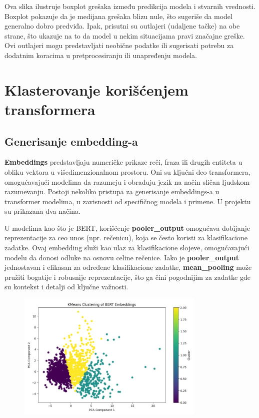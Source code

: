 \documentclass{article}
\begin{document}
Ova slika ilustruje boxplot grešaka između predikcija modela i stvarnih vrednosti. Boxplot pokazuje da je medijana grešaka blizu nule, što sugeriše da model generalno dobro predviđa. Ipak, prisutni su outlajeri (udaljene tačke) na obe strane, što ukazuje na to da model u nekim situacijama pravi značajne greške. Ovi outlajeri mogu predstavljati neobične podatke ili sugerisati potrebu za dodatnim koracima u pretprocesiranju ili unapređenju modela.



\section{Klasterovanje korišćenjem transformera}

\subsection{Generisanje embedding-a}

\textbf{Embeddings} predstavljaju numeričke prikaze reči, fraza ili drugih entiteta u obliku vektora u višedimenzionalnom prostoru. Oni su ključni deo transformera, omogućavajući modelima da razumeju i obrađuju jezik na način sličan ljudskom razumevanju. Postoji nekoliko pristupa za generisanje embeddings-a u transformer modelima, u zavisnosti od specifičnog modela i primene. U projektu su prikazana dva načina.

\vspace{1em}
U modelima kao što je BERT, korišćenje \textbf{pooler\_output} omogućava dobijanje reprezentacije za ceo unos (npr. rečenicu), koja se često koristi za klasifikacione zadatke. Ovaj embedding služi kao ulaz za klasifikacione slojeve, omogućavajući modelu da donosi odluke na osnovu celine rečenice. Iako je \textbf{pooler\_output} jednostavan i efikasan za određene klasifikacione zadatke, \textbf{mean\_pooling} može pružiti bogatije i robusnije reprezentacije, što ga čini pogodnijim za zadatke gde su kontekst i detalji od ključne važnosti.

\newpage
\begin{figure}[h]
    \centering 
    \includegraphics[width=0.8\textwidth]{ri5.jpeg} 
\end{figure}
\end{document}

